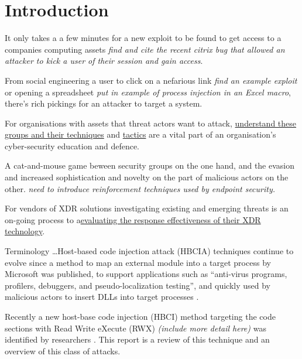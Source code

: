 \section{Introduction}


It only takes a a few minutes for a new exploit to be found to get access to a companies computing assets \textit{find and cite the recent citrix bug that allowed an attacker to kick a user of their session and gain access}.

From social engineering a user to click on a nefarious link \textit{find an example exploit} or opening a spreadsheet \textit{put in example of process injection in an Excel macro}, there's rich pickings for an attacker to target a system.

For organisations with assets that threat actors want to attack, \href{https://www.cisa.gov/news-events/cybersecurity-advisories/aa23-165a}{understand these groups and their techniques} and \href{https://www.cshub.com/attacks/articles/five-active-ransomware-gangs-and-their-tactics-part-one}{tactics} are a vital part of an organisation's cyber-security education and defence.

A cat-and-mouse game beween security groups on the one hand, and the evasion and increased sophistication and novelty on the part of malicious actors on the other.  \textit{need to introduce reinforcement techniques used by endpoint security.} 

For vendors of XDR solutions investigating existing and emerging threats is an on-going process to a\href{https://research.tue.nl/files/305661196/Olteanu_I.C..pdf}{evaluating the response effectiveness of their XDR technology}.

Terminology \ldots Host-based code injection attack (HBCIA) techniques \autocite{Barabosch:2014} continue to evolve since a method to map an external module into a target process by Microsoft \autocite{Ghizzoni:2004} was published, to support applications such as ``anti-virus programs, profilers, debuggers, and pseudo-localization testing'', and quickly used by malicious actors to insert DLLs into target processes \autocite{Jang:2007}.

Recently a new host-base code injection (HBCI) method targeting the code sections with Read Write eXecute (RWX)  \textit{(include more detail here)} was identified by researchers \autocite{Peixoto:2023}.  This report is a review of this technique and an overview of this class of attacks.

